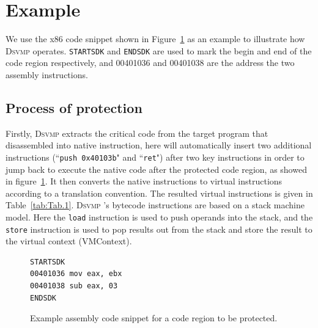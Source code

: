 \documentclass[times]{secauth}
\newcommand{\DSVMP}{\textsc{Dsvmp }}
\begin{document}
\section{Example\label{sec:case}}
We use the x86 code snippet shown in Figure~\ref{fig:examplecode} as an example to illustrate how \DSVMP operates.
\texttt{STARTSDK} and \texttt{ENDSDK} are used to mark the begin and end of the code region respectively,
and 00401036 and 00401038 are the address the two assembly instructions.


\subsection{Process of protection}
Firstly, \DSVMP extracts the critical code from the target program that disassembled into native instruction, here will automatically insert two additional instructions (``\texttt{push 0x40103b}" and ``\texttt{ret}") after two key
instructions in order to jump back to execute the native code
after the protected code region, as showed in figure~\ref{fig:examplecode}.
It then converts the native instructions to virtual instructions according to a translation convention.
The resulted virtual instructions is given in Table~\ref{tab:Tab.1}.
\DSVMP's bytecode instructions are based on a stack machine model.
Here the \texttt{load} instruction is used to push operands into the stack,
and the \texttt{store} instruction is used to pop results out from the stack
and store the result to the virtual context (VMContext).


\begin{figure}[t!]
\scriptsize
\begin{lstlisting}
STARTSDK
00401036 mov eax, ebx
00401038 sub eax, 03
ENDSDK
\end{lstlisting}
\caption{Example assembly code snippet for a code region to be protected.}
\label{fig:examplecode}
\end{figure}
\end{document}
